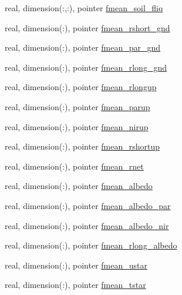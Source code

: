 \begin{DoxyCompactItemize}
real, dimension(\+:,\+:), pointer \hyperlink{structed__state__vars_1_1sitetype_a5cbcb64f4dcc4b488d7c60c1cd0cf8b1}{fmean\+\_\+soil\+\_\+fliq}
\item 
real, dimension(\+:), pointer \hyperlink{structed__state__vars_1_1sitetype_a29f91c48ceace3962fc70ad62745ddd5}{fmean\+\_\+rshort\+\_\+gnd}
\item 
real, dimension(\+:), pointer \hyperlink{structed__state__vars_1_1sitetype_a16d7e7a95c3c322de3a91e045a84bf03}{fmean\+\_\+par\+\_\+gnd}
\item 
real, dimension(\+:), pointer \hyperlink{structed__state__vars_1_1sitetype_a5bb50d5620c6375ede6f254c93e25973}{fmean\+\_\+rlong\+\_\+gnd}
\item 
real, dimension(\+:), pointer \hyperlink{structed__state__vars_1_1sitetype_a02c8e90abc537a22a6dae348b5aa8484}{fmean\+\_\+rlongup}
\item 
real, dimension(\+:), pointer \hyperlink{structed__state__vars_1_1sitetype_a4202e095edee9766e4f1253245a20ef4}{fmean\+\_\+parup}
\item 
real, dimension(\+:), pointer \hyperlink{structed__state__vars_1_1sitetype_a98b19bbe29732b962a329eaf9c204d8f}{fmean\+\_\+nirup}
\item 
real, dimension(\+:), pointer \hyperlink{structed__state__vars_1_1sitetype_a5bac63868d909256c33234856891ea6a}{fmean\+\_\+rshortup}
\item 
real, dimension(\+:), pointer \hyperlink{structed__state__vars_1_1sitetype_a5acc6ccff16ddf1f992f5dbc56737948}{fmean\+\_\+rnet}
\item 
real, dimension(\+:), pointer \hyperlink{structed__state__vars_1_1sitetype_a622be936ad34b6c495f1a7f9aa0b8e4c}{fmean\+\_\+albedo}
\item 
real, dimension(\+:), pointer \hyperlink{structed__state__vars_1_1sitetype_ab05a74b498061318e6ccbe1e1ca446e8}{fmean\+\_\+albedo\+\_\+par}
\item 
real, dimension(\+:), pointer \hyperlink{structed__state__vars_1_1sitetype_ad21dcc946446df771572b4cd960fea75}{fmean\+\_\+albedo\+\_\+nir}
\item 
real, dimension(\+:), pointer \hyperlink{structed__state__vars_1_1sitetype_a1935904acb29d3ecddabac46d38b6457}{fmean\+\_\+rlong\+\_\+albedo}
\item 
real, dimension(\+:), pointer \hyperlink{structed__state__vars_1_1sitetype_a81efdbbbeb34081406a434e9f6eaa994}{fmean\+\_\+ustar}
\item 
real, dimension(\+:), pointer \hyperlink{structed__state__vars_1_1sitetype_ad266d344f021696468cbc89bc6f13248}{fmean\+\_\+tstar}

\end{DoxyCompactItemize}
